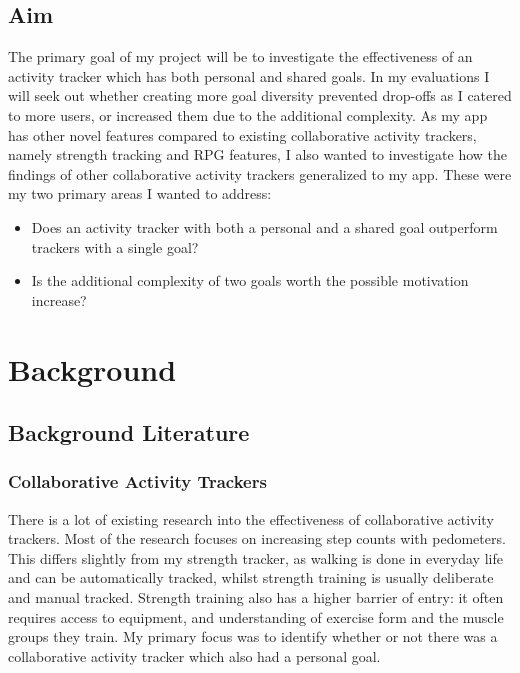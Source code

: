 \documentclass{l4proj}
\begin{document}
%
%
%

\section{Aim}
The primary goal of my project will be to investigate the effectiveness of an activity tracker which has both personal and shared goals. In my evaluations I will seek out whether creating more goal diversity prevented drop-offs as I catered to more users, or increased them due to the additional complexity. As my app has other novel features compared to existing collaborative activity trackers, namely strength tracking and RPG features, I also wanted to investigate how the findings of other collaborative activity trackers generalized to my app. These were my two primary areas I wanted to address:
\begin{itemize}
  \item Does an activity tracker with both a personal and a shared goal outperform trackers with a single goal?
  \item Is the additional complexity of two goals worth the possible motivation increase?
\end{itemize}
  




\chapter{Background}

\section{Background Literature}

\subsection{Collaborative Activity Trackers}
There is a lot of existing research into the effectiveness of collaborative activity trackers. Most of the research focuses on increasing step counts with pedometers. This differs slightly from my strength tracker, as walking is done in everyday life and can be automatically tracked, whilst strength training is usually deliberate and manual tracked. Strength training also has a higher barrier of entry: it often requires access to equipment, and understanding of exercise form and the muscle groups they train. My primary focus was to identify whether or not there was a collaborative activity tracker which also had a personal goal.
\end{document}

